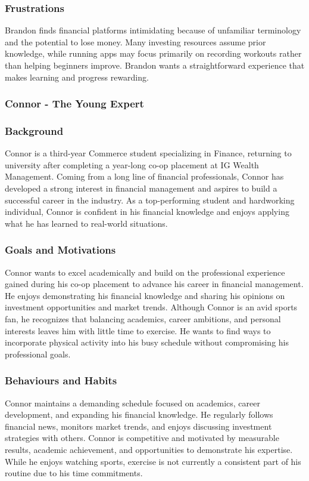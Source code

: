\documentclass[12pt]{article}
\begin{document}
\subsubsection*{Frustrations}
Brandon finds financial platforms intimidating because of unfamiliar terminology and the potential to lose money. Many investing resources assume prior knowledge, while running apps may focus primarily on recording workouts rather than helping beginners improve. Brandon wants a straightforward experience that makes learning and progress rewarding.

\subsubsection{Connor - The Young Expert}
\subsubsection*{Background}
Connor is a third-year Commerce student specializing in Finance, returning to university after completing a year-long co-op placement at IG Wealth Management. Coming from a long line of financial professionals, Connor has developed a strong interest in financial management and aspires to build a successful career in the industry. As a top-performing student and hardworking individual, Connor is confident in his financial knowledge and enjoys applying what he has learned to real-world situations.

\subsubsection*{Goals and Motivations}
Connor wants to excel academically and build on the professional experience gained during his co-op placement to advance his career in financial management. He enjoys demonstrating his financial knowledge and sharing his opinions on investment opportunities and market trends. Although Connor is an avid sports fan, he recognizes that balancing academics, career ambitions, and personal interests leaves him with little time to exercise. He wants to find ways to incorporate physical activity into his busy schedule without compromising his professional goals.

\subsubsection*{Behaviours and Habits}
Connor maintains a demanding schedule focused on academics, career development, and expanding his financial knowledge. He regularly follows financial news, monitors market trends, and enjoys discussing investment strategies with others. Connor is competitive and motivated by measurable results, academic achievement, and opportunities to demonstrate his expertise. While he enjoys watching sports, exercise is not currently a consistent part of his routine due to his time commitments.
\end{document}

